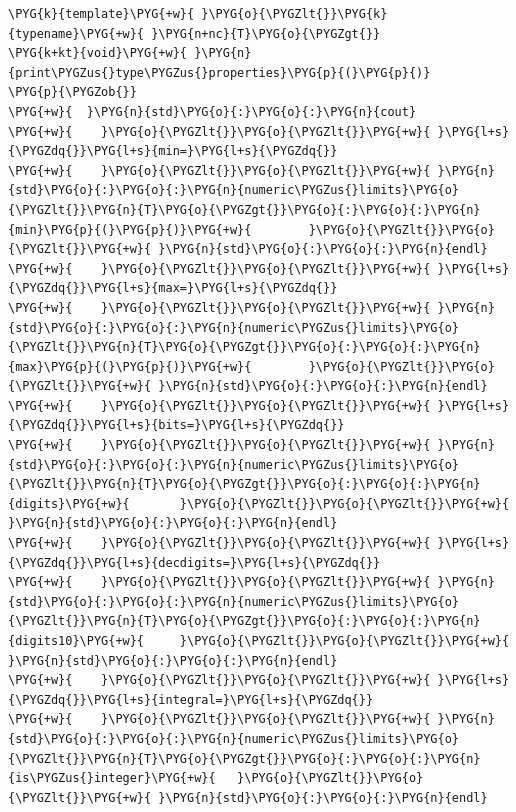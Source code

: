 \begin{codeblockbg}
\begin{Verbatim}[commandchars=\\\{\},breaklines=true,breakanywhere=true,fontsize=\codefont,xleftmargin=17bp]
\PYG{k}{template}\PYG{+w}{ }\PYG{o}{\PYGZlt{}}\PYG{k}{typename}\PYG{+w}{ }\PYG{n+nc}{T}\PYG{o}{\PYGZgt{}}
\PYG{k+kt}{void}\PYG{+w}{ }\PYG{n}{print\PYGZus{}type\PYGZus{}properties}\PYG{p}{(}\PYG{p}{)}
\PYG{p}{\PYGZob{}}
\PYG{+w}{  }\PYG{n}{std}\PYG{o}{:}\PYG{o}{:}\PYG{n}{cout}
\PYG{+w}{    }\PYG{o}{\PYGZlt{}}\PYG{o}{\PYGZlt{}}\PYG{+w}{ }\PYG{l+s}{\PYGZdq{}}\PYG{l+s}{min=}\PYG{l+s}{\PYGZdq{}}
\PYG{+w}{    }\PYG{o}{\PYGZlt{}}\PYG{o}{\PYGZlt{}}\PYG{+w}{ }\PYG{n}{std}\PYG{o}{:}\PYG{o}{:}\PYG{n}{numeric\PYGZus{}limits}\PYG{o}{\PYGZlt{}}\PYG{n}{T}\PYG{o}{\PYGZgt{}}\PYG{o}{:}\PYG{o}{:}\PYG{n}{min}\PYG{p}{(}\PYG{p}{)}\PYG{+w}{        }\PYG{o}{\PYGZlt{}}\PYG{o}{\PYGZlt{}}\PYG{+w}{ }\PYG{n}{std}\PYG{o}{:}\PYG{o}{:}\PYG{n}{endl}
\PYG{+w}{    }\PYG{o}{\PYGZlt{}}\PYG{o}{\PYGZlt{}}\PYG{+w}{ }\PYG{l+s}{\PYGZdq{}}\PYG{l+s}{max=}\PYG{l+s}{\PYGZdq{}}
\PYG{+w}{    }\PYG{o}{\PYGZlt{}}\PYG{o}{\PYGZlt{}}\PYG{+w}{ }\PYG{n}{std}\PYG{o}{:}\PYG{o}{:}\PYG{n}{numeric\PYGZus{}limits}\PYG{o}{\PYGZlt{}}\PYG{n}{T}\PYG{o}{\PYGZgt{}}\PYG{o}{:}\PYG{o}{:}\PYG{n}{max}\PYG{p}{(}\PYG{p}{)}\PYG{+w}{        }\PYG{o}{\PYGZlt{}}\PYG{o}{\PYGZlt{}}\PYG{+w}{ }\PYG{n}{std}\PYG{o}{:}\PYG{o}{:}\PYG{n}{endl}
\PYG{+w}{    }\PYG{o}{\PYGZlt{}}\PYG{o}{\PYGZlt{}}\PYG{+w}{ }\PYG{l+s}{\PYGZdq{}}\PYG{l+s}{bits=}\PYG{l+s}{\PYGZdq{}}
\PYG{+w}{    }\PYG{o}{\PYGZlt{}}\PYG{o}{\PYGZlt{}}\PYG{+w}{ }\PYG{n}{std}\PYG{o}{:}\PYG{o}{:}\PYG{n}{numeric\PYGZus{}limits}\PYG{o}{\PYGZlt{}}\PYG{n}{T}\PYG{o}{\PYGZgt{}}\PYG{o}{:}\PYG{o}{:}\PYG{n}{digits}\PYG{+w}{       }\PYG{o}{\PYGZlt{}}\PYG{o}{\PYGZlt{}}\PYG{+w}{ }\PYG{n}{std}\PYG{o}{:}\PYG{o}{:}\PYG{n}{endl}
\PYG{+w}{    }\PYG{o}{\PYGZlt{}}\PYG{o}{\PYGZlt{}}\PYG{+w}{ }\PYG{l+s}{\PYGZdq{}}\PYG{l+s}{decdigits=}\PYG{l+s}{\PYGZdq{}}
\PYG{+w}{    }\PYG{o}{\PYGZlt{}}\PYG{o}{\PYGZlt{}}\PYG{+w}{ }\PYG{n}{std}\PYG{o}{:}\PYG{o}{:}\PYG{n}{numeric\PYGZus{}limits}\PYG{o}{\PYGZlt{}}\PYG{n}{T}\PYG{o}{\PYGZgt{}}\PYG{o}{:}\PYG{o}{:}\PYG{n}{digits10}\PYG{+w}{     }\PYG{o}{\PYGZlt{}}\PYG{o}{\PYGZlt{}}\PYG{+w}{ }\PYG{n}{std}\PYG{o}{:}\PYG{o}{:}\PYG{n}{endl}
\PYG{+w}{    }\PYG{o}{\PYGZlt{}}\PYG{o}{\PYGZlt{}}\PYG{+w}{ }\PYG{l+s}{\PYGZdq{}}\PYG{l+s}{integral=}\PYG{l+s}{\PYGZdq{}}
\PYG{+w}{    }\PYG{o}{\PYGZlt{}}\PYG{o}{\PYGZlt{}}\PYG{+w}{ }\PYG{n}{std}\PYG{o}{:}\PYG{o}{:}\PYG{n}{numeric\PYGZus{}limits}\PYG{o}{\PYGZlt{}}\PYG{n}{T}\PYG{o}{\PYGZgt{}}\PYG{o}{:}\PYG{o}{:}\PYG{n}{is\PYGZus{}integer}\PYG{+w}{   }\PYG{o}{\PYGZlt{}}\PYG{o}{\PYGZlt{}}\PYG{+w}{ }\PYG{n}{std}\PYG{o}{:}\PYG{o}{:}\PYG{n}{endl}

\end{Verbatim}
\end{codeblockbg}
